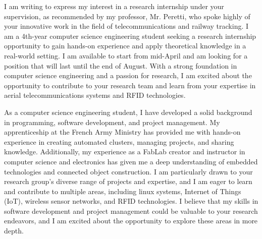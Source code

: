 \documentclass[11pt, a4paper]{awesome-cv}
\begin{document}
\hspace{8cm}\makeclheader[L]


\makelettertitle

\begin{cvletter}

I am writing to express my interest in a research internship under your supervision, as recommended by my professor, Mr. Peretti, who spoke highly of your innovative work in the field of telecommunications and railway tracking. I am a 4th-year computer science engineering student seeking a research internship opportunity to gain hands-on experience and apply theoretical knowledge in a real-world setting. I am available to start from mid-April and am looking for a position that will last until the end of August. With a strong foundation in computer science engineering and a passion for research, I am excited about the opportunity to contribute to your research team and learn from your expertise in aerial telecommunications systems and RFID technologies.

As a computer science engineering student, I have developed a solid background in programming, software development, and project management. My apprenticeship at the French Army Ministry has provided me with hands-on experience in creating automated clusters, managing projects, and sharing knowledge. Additionally, my experience as a FabLab creator and instructor in computer science and electronics has given me a deep understanding of embedded technologies and connected object construction. I am particularly drawn to your research group's diverse range of projects and expertise, and I am eager to learn and contribute to multiple areas, including linux systems, Internet of Things (IoT), wireless sensor networks, and RFID technologies. I believe that my skills in software development and project management could be valuable to your research endeavors, and I am excited about the opportunity to explore these areas in more depth.


\end{cvletter}
\end{document}
